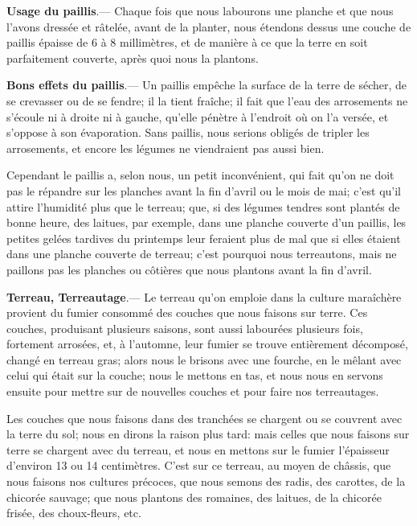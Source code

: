 \documentclass[10pt,a4paper]{book}
\begin{document}
\textbf{Usage du paillis}.— Chaque fois que nous labourons une planche et que nous l'avons dressée et râtelée, avant de la planter, nous étendons dessus une couche de paillis épaisse de 6 à 8 millimètres, et de manière à ce que la terre en soit parfaitement couverte, après quoi nous la plantons.

\textbf{Bons effets du paillis}.--- Un paillis empêche la surface de la terre de sécher, de se crevasser ou de se fendre; il la tient fraîche; il fait que l'eau des arrosements ne s'écoule ni à droite ni à gauche, qu'elle pénètre à l'endroit où on l'a versée, et s'oppose à son évaporation. Sans paillis, nous serions obligés de tripler les arrosements, et encore les légumes ne viendraient pas aussi bien.

Cependant le paillis a, selon nous, un petit inconvénient, qui fait qu'on ne doit pas le répandre sur les planches avant la fin d'avril ou le mois de mai; c'est qu'il attire l'humidité plus que le terreau; que, si des légumes tendres sont plantés de bonne heure, des laitues, par exemple, dans une planche couverte d'un paillis, les petites gelées tardives du printemps leur feraient plus de mal que si elles étaient dans une planche couverte de terreau; c'est pourquoi nous terreautons, mais ne paillons pas les planches ou côtières que nous plantons avant la fin d'avril.

\textbf{Terreau, Terreautage}.--- Le terreau qu'on emploie dans la culture maraîchère provient du fumier consommé des couches que nous faisons sur terre. Ces couches, produisant plusieurs saisons, sont aussi labourées plusieurs fois, fortement arrosées, et, à l'automne, leur fumier se trouve entièrement décomposé, changé en terreau gras; alors nous le brisons avec une fourche, en le mêlant avec celui qui était sur la couche; nous le mettons en tas, et nous nous en servons ensuite pour mettre sur de nouvelles couches et pour faire nos terreautages.

Les couches que nous faisons dans des tranchées se chargent ou se couvrent avec la terre du sol; nous en dirons la raison plus tard: mais celles que nous faisons sur terre se chargent avec du terreau, et nous en mettons sur le fumier l'épaisseur d'environ 13 ou 14 centimètres. C'est sur ce terreau, au moyen de châssis, que nous faisons nos cultures précoces, que nous semons des radis, des carottes, de la chicorée sauvage; que nous plantons des romaines, des laitues, de la chicorée frisée, des choux-fleurs, etc.
\end{document}
